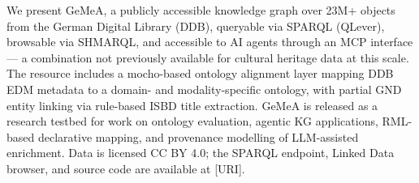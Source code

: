 We present GeMeA, a publicly accessible knowledge graph over 23M+ objects from the German Digital Library (DDB), queryable via SPARQL (QLever), browsable via SHMARQL, and accessible to AI agents through an MCP interface — a combination not previously available for cultural heritage data at this scale. The resource includes a mocho-based ontology alignment layer mapping DDB EDM metadata to a domain- and modality-specific ontology, with partial GND entity linking via rule-based ISBD title extraction. GeMeA is released as a research testbed for work on ontology evaluation, agentic KG applications, RML-based declarative mapping, and provenance modelling of LLM-assisted enrichment. Data is licensed CC BY 4.0; the SPARQL endpoint, Linked Data browser, and source code are available at [URI].